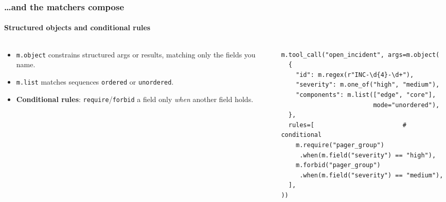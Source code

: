 \documentclass[
	aspectratio=169, %
	t,               %
	onlytextwidth,
	10pt,
]{beamer}
\begin{document}
\begin{frame}[fragile]
	\frametitle{\ldots and the matchers compose}
	\framesubtitle{Structured objects and conditional rules}
	\begin{columns}[T,onlytextwidth]
		\begin{column}{0.36\linewidth}
			\begin{itemize}
				\setlength\itemsep{0.8em}
				\item \texttt{m.object} constrains structured args or results, matching only the
				fields you name.
				\item \texttt{m.list} matches sequences \texttt{ordered} or \texttt{unordered}.
				\item \textbf{Conditional rules}: \texttt{require}/\texttt{forbid} a field only
				\emph{when} another field holds.
			\end{itemize}
		\end{column}
		\hfill
		\begin{column}{0.55\linewidth}
\begin{lstlisting}
m.tool_call("open_incident", args=m.object(
  {
    "id": m.regex(r"INC-\d{4}-\d+"),
    "severity": m.one_of("high", "medium"),
    "components": m.list(["edge", "core"],
                         mode="unordered"),
  },
  rules=[                        # conditional
    m.require("pager_group")
     .when(m.field("severity") == "high"),
    m.forbid("pager_group")
     .when(m.field("severity") == "medium"),
  ],
))
\end{lstlisting}
		\end{column}
	\end{columns}
\end{frame}
\end{document}
